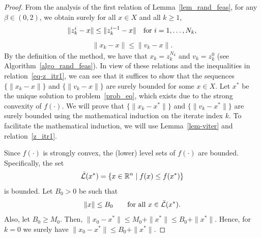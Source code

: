 \documentclass{article}
\def\re{\mathbb{R}}
\theoremstyle{plain}
\theoremstyle{definition}
\theoremstyle{remark}
\begin{document}
\begin{proof}
From the analysis of the first relation of Lemma~\ref{lem_rand_feas}, for any $\beta \in (0,2)$, we obtain surely for all $x \in X$ and all $k\ge1$,
    \begin{align}\label{eq-z_itr1} 
        \|z_{k}^i - x\| \le  \|z_{k}^{i-1} - x\| \quad \hbox{for } i=1,\ldots,N_k,    
    \end{align}
\begin{align}\label{z_itr1} 
    \|x_k-x\|\le \|v_k-x\|.
\end{align}
By the definition of the method, we have that $x_k=z_{k}^{N_k}$ and $v_k=z_{k}^{0} $ (see Algorithm~\ref{algo_rand_feas}). In view of these relations and the inequalities in relation~\eqref{eq-z_itr1}, we can see that it suffices to show that the sequences $\{\|x_k-x\|\}$ and $\{\|v_k-x\|\}$ are surely bounded for some $x\in X$. Let $x^*$ be the unique solution to problem~\eqref{prob_eq}, which exists due to the strong convexity of $f(\cdot)$. We will prove that $\{\|x_k-x^*\|\}$ and $\{\|v_k-x^*\|\}$ are surely bounded using the mathematical induction on the iterate index $k$. To facilitate the mathematical induction, we will use Lemma~\ref{lem-viter} and relation~\eqref{z_itr1}. 

Since $f(\cdot)$ is strongly convex, the (lower) level sets of $f(\cdot)$ are bounded. Specifically, the set
    \[{\cal \bar L}(x^*)=\{x\in\re^n\mid f(x)\le f(x^*)\}\] is bounded.
    Let $B_0>0$ be such that 
     \begin{equation}\label{eq-bconst}
     \|x\|\le B_0\qquad\hbox{for all }x\in {\cal \bar L}(x^*).\end{equation}
    Also, let $B_0\ge M_0$. Then, 
    $\|x_0-x^*\|\le M_0+\|x^*\|\le B_0+\|x^*\|$. Hence,
    for $k=0$ we surely have $\|x_0-x^*\|\le B_0+\|x^*\|$.
    

\end{proof}
\end{document}
